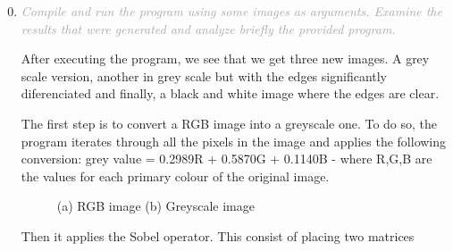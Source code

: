 \documentclass{article}
\newcommand{\greyItem}[1]{\item\emph{\textcolor{darkgray}{#1}}}
\begin{document}
\begin{enumerate}[label=5.\arabic*,leftmargin=*]
    \setcounter{enumi}{-1}

\greyItem{Compile and run the program using some images as arguments. Examine the results that were generated and analyze briefly the provided program.}

After executing the program, we see that we get three new images. A grey scale version, another in grey scale but with the edges significantly diferenciated and finally, a black and white image where the edges are clear. 

The first step is to convert a RGB image into a greyscale one. To do so, the program iterates through all the pixels in the image and applies the following conversion:  grey value = 0.2989R + 0.5870G + 0.1140B - where R,G,B are the values for each primary colour of the original image.

\begin{figure}[htbp]
    \centering
    \caption{(a) RGB image (b) Greyscale image }
\end{figure}

Then it applies the Sobel operator. This consist of placing two matrices


\end{enumerate}
\end{document}
